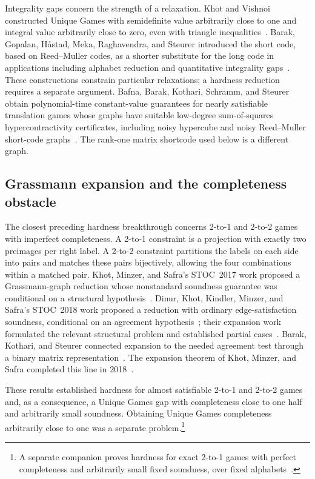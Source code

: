 Integrality gaps concern the strength of a relaxation. Khot and Vishnoi
constructed Unique Games with semidefinite value arbitrarily close to
one and integral value arbitrarily close to zero, even with triangle
inequalities~\cite{KV15}. Barak, Gopalan, H\aa stad, Meka, Raghavendra,
and Steurer introduced the short code, based on Reed--Muller codes, as a
shorter substitute for the long code in applications including alphabet
reduction and quantitative integrality gaps~\cite{BGHMRS15}. These constructions constrain particular
relaxations; a hardness reduction requires a separate argument.
Bafna, Barak, Kothari, Schramm, and Steurer obtain polynomial-time
constant-value guarantees for nearly satisfiable translation games
whose graphs have suitable low-degree sum-of-squares hypercontractivity
certificates, including noisy hypercube and noisy Reed--Muller short-code
graphs~\cite{BBKSS21}. The rank-one matrix shortcode used below is a
different graph.

\subsection{Grassmann expansion and the completeness obstacle}

The closest preceding hardness breakthrough concerns 2-to-1 and
2-to-2 games with imperfect completeness. A 2-to-1 constraint is a
projection with exactly two preimages per right label. A 2-to-2
constraint partitions the labels on each side into pairs and matches
these pairs bijectively, allowing the four combinations within a
matched pair. Khot, Minzer, and Safra's STOC~2017 work proposed a
Grassmann-graph reduction whose nonstandard soundness guarantee was
conditional on a structural hypothesis~\cite{KMS17}. Dinur, Khot,
Kindler, Minzer, and Safra's STOC~2018 work proposed a reduction with
ordinary edge-satisfaction soundness, conditional on an agreement
hypothesis~\cite{DKKMS25}; their expansion work formulated the relevant
structural problem and established partial cases~\cite{DKKMS21Expansion}.
Barak, Kothari, and Steurer connected expansion to the needed agreement
test through a binary matrix representation~\cite{BKS18}. The expansion
theorem of Khot, Minzer, and Safra completed this line in
2018~\cite{KMS23}.

These results established hardness for almost satisfiable 2-to-1 and
2-to-2 games and, as a consequence, a Unique Games gap with completeness
close to one half and arbitrarily small soundness. Obtaining Unique
Games completeness arbitrarily close to one was a separate problem.\footnote{A
separate companion proves hardness for exact 2-to-1 games with perfect
completeness and arbitrarily small fixed soundness, over fixed
alphabets~\cite[Theorem~1.1]{OpenAIPerfectTwoToOne2026}.}

